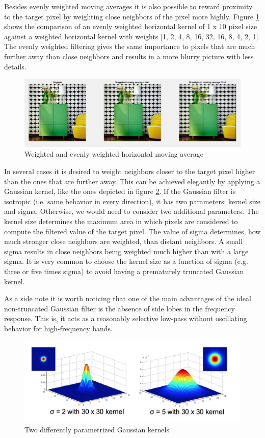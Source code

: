 Besides evenly weighted moving averages it is also possible to reward proximity to the target pixel by weighting close neighbors of the pixel more highly. Figure \ref{fig:task11} shows the comparison of an evenly weighted horizontal kernel of 1 x 10 pixel size against a weighted horizontal kernel with weights [1, 2, 4, 8, 16, 32, 16, 8, 4, 2, 1]. The evenly weighted filtering gives the same importance to pixels that are much further away than close neighbors and results in a more blurry picture with less details.

\begin{figure}[!hbt]
  \includegraphics[width=\textwidth]{./img/task11.png}
  \caption{Weighted and evenly weighted horizontal moving average}
  \label{fig:task11}
\end{figure}

In several cases it is desired to weight neighbors closer to the target pixel higher than the ones that are further away. This can be achieved elegantly by applying a Gaussian kernel, like the ones depicted in figure \ref{fig:task12}. If the Gaussian filter is isotropic (i.e. same behavior in every direction), it has two parameters: kernel size and sigma. Otherwise, we would need to consider two additional parameters. The kernel size determines the maximum area in which pixels are considered to compute the filtered value of the target pixel. The value of sigma determines, how much stronger close neighbors are weighted, than distant neighbors. A small sigma results in close neighbors being weighted much higher than with a large sigma. It is very common to choose the kernel size as a function of sigma (e.g. three or five times sigma) to avoid having a prematurely truncated Gaussian kernel.

As a side note it is worth noticing that one of the main advantages of the ideal non-truncated Gaussian filter is the absence of side lobes in the frequency response. This is, it acts as a reasonably selective low-pass without oscillating behavior for high-frequency bands.

\begin{figure}[!hbt]
  \includegraphics[width=\textwidth]{./img/task12.png}
  \caption{Two differently parametrized Gaussian kernels}
  \label{fig:task12}
\end{figure}

